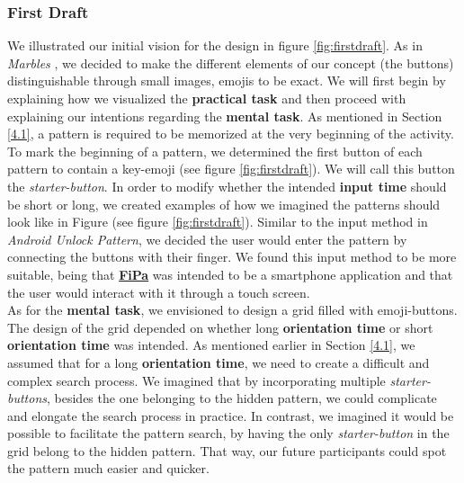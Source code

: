 \subsubsection{First Draft} \label{4.2.2.1}
We illustrated our initial vision for the design in figure \ref{fig:firstdraft}. As in \textit{Marbles} \cite{patternRotation, anonymous}, we decided to make the different elements of our concept (the buttons) distinguishable through small images, emojis to be exact. We will first begin by explaining how we visualized the \textbf{practical task} and then proceed with explaining our intentions regarding the \textbf{mental task}. As mentioned in Section \ref{4.1}, a pattern is required to be memorized at the very beginning of the activity. To mark the beginning of a pattern, we determined the first button of each pattern to contain a key-emoji (see figure \ref{fig:firstdraft}). We will call this button the \textit{starter-button}. In order to modify whether the intended \textbf{input time} should be short or long, we created examples of how we imagined the patterns should look like in Figure (see figure \ref{fig:firstdraft}). Similar to the input method in \textit{Android Unlock Pattern}, we decided the user would enter the pattern by connecting the buttons with their finger. We found this input method to be more suitable, being that \underline{\textbf{FiPa}} was intended to be a smartphone application and that the user would interact with it through a touch screen. \\

As for the \textbf{mental task}, we envisioned to design a grid filled with emoji-buttons. The design of the grid depended on whether long \textbf{orientation time} or short \textbf{orientation time} was intended. As mentioned earlier in Section \ref{4.1}, we assumed that for a long \textbf{orientation time}, we need to create a difficult and complex search process. We imagined that by incorporating multiple \textit{starter-buttons}, besides the one belonging to the hidden pattern, we could complicate and elongate the search process in practice. In contrast, we imagined it would be possible to facilitate the pattern search, by having the only \textit{starter-button} in the grid belong to the hidden pattern. That way, our future participants could spot the pattern much easier and quicker. 

